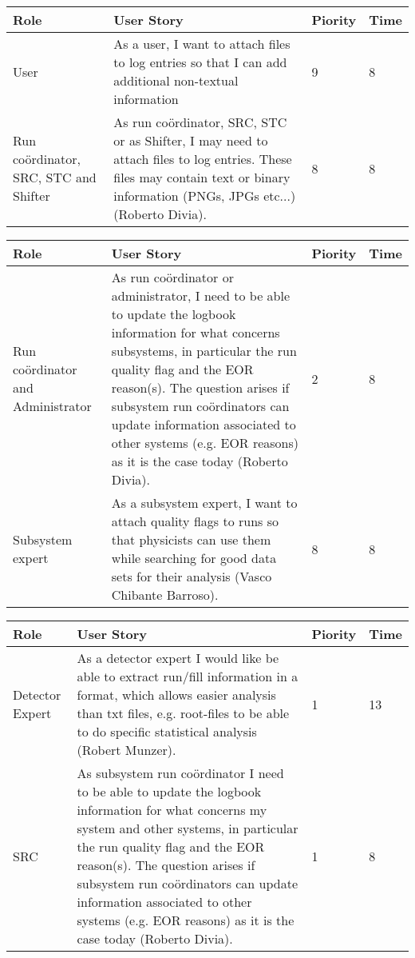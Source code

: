 \begin{longtable}{ | p{2cm} | p{8cm} | p{1.5cm} | l |}
\hline
Role & User Story & Piority & Time \\ \hline
User &  As a user, I want to attach files to log entries so that I can add additional non-textual information & 9 & 8 \\ \hline
Run coördinator, SRC, STC and Shifter& As run coördinator, SRC, STC or as Shifter, I may need to attach files to log entries. These files may contain text or binary information (PNGs, JPGs etc...) (Roberto Divia). & 8 & 8 \\ \hline

\end{longtable}
\newpage
\begin{longtable}{ | p{2cm} | p{8cm} | p{1.5cm} | l |}
\hline
Role & User Story & Piority & Time \\ \hline
Run coördinator and Administrator &  As run coördinator or administrator, I need to be able to update the logbook information for what concerns subsystems, in particular the run quality flag and the EOR reason(s). The question arises if subsystem run coördinators can update information associated to other systems (e.g. EOR
reasons) as it is the case today (Roberto Divia). & 2 & 8 \\ \hline
Subsystem expert & As a subsystem expert, I want to attach quality flags to runs so that
physicists can use them while searching for good data sets for their analysis (Vasco Chibante Barroso). & 8 & 8 \\ \hline
\end{longtable}

\begin{longtable}{ | p{2cm} | p{8cm} | p{1.5cm} | l |}
\hline
Role & User Story & Piority & Time \\ \hline
Detector Expert & As a detector expert I would like be able to extract run/fill information in a format, which allows easier analysis than txt files, e.g. root-files to be able to do specific statistical analysis (Robert Munzer). & 1 & 13 \\ \hline
SRC &  As subsystem run coördinator I need to be able to update the logbook information for what concerns my system and other systems, in particular the run quality flag and the EOR reason(s). The question arises if subsystem run coördinators can update information associated to other systems (e.g. EOR reasons) as it is the case today (Roberto Divia). & 1 & 8 \\ \hline

\end{longtable}
\newpage

